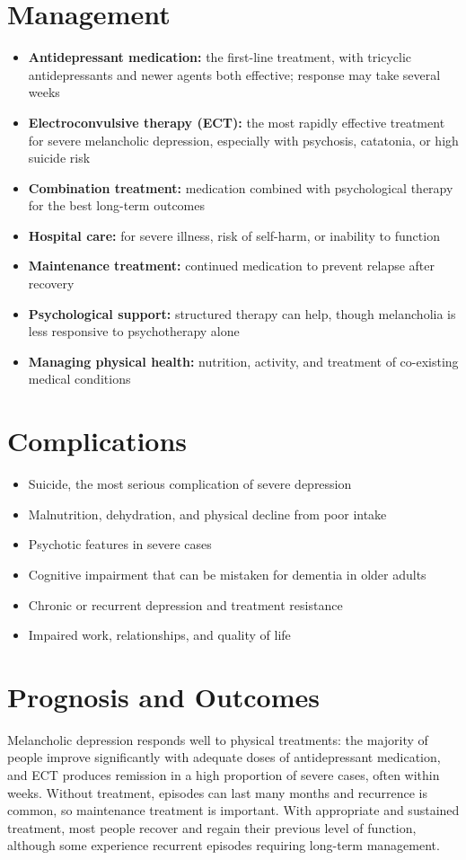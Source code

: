 \section*{Management}
\begin{itemize}
    \item \textbf{Antidepressant medication:} the first-line treatment, with tricyclic antidepressants and newer agents both effective; response may take several weeks
    \item \textbf{Electroconvulsive therapy (ECT):} the most rapidly effective treatment for severe melancholic depression, especially with psychosis, catatonia, or high suicide risk
    \item \textbf{Combination treatment:} medication combined with psychological therapy for the best long-term outcomes
    \item \textbf{Hospital care:} for severe illness, risk of self-harm, or inability to function
    \item \textbf{Maintenance treatment:} continued medication to prevent relapse after recovery
    \item \textbf{Psychological support:} structured therapy can help, though melancholia is less responsive to psychotherapy alone
    \item \textbf{Managing physical health:} nutrition, activity, and treatment of co-existing medical conditions
\end{itemize}

\section*{Complications}
\begin{itemize}
    \item Suicide, the most serious complication of severe depression
    \item Malnutrition, dehydration, and physical decline from poor intake
    \item Psychotic features in severe cases
    \item Cognitive impairment that can be mistaken for dementia in older adults
    \item Chronic or recurrent depression and treatment resistance
    \item Impaired work, relationships, and quality of life
\end{itemize}

\section*{Prognosis and Outcomes}
Melancholic depression responds well to physical treatments: the majority of people improve significantly with adequate doses of antidepressant medication, and ECT produces remission in a high proportion of severe cases, often within weeks. Without treatment, episodes can last many months and recurrence is common, so maintenance treatment is important. With appropriate and sustained treatment, most people recover and regain their previous level of function, although some experience recurrent episodes requiring long-term management.

